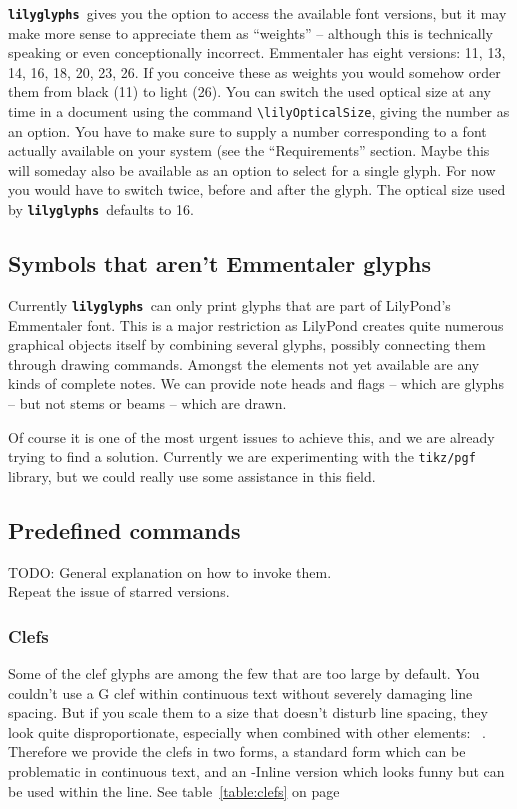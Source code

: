 \documentclass{article}
\newcommand{\lilyglyphs}{\texttt{\textbf{lilyglyphs\,}}}
\newcommand*{\cmd}[1]{\texttt{\textbackslash #1}}
\begin{document}
\lilyglyphs gives you the option to access the available font versions, but it may make more sense to appreciate them as \enquote{weights} -- although this is technically speaking or even conceptionally incorrect.
Emmentaler has eight versions: 11, 13, 14, 16, 18, 20, 23, 26. 
If you conceive these as weights you would somehow order them from black (11) to light (26).
You can switch the used optical size at any time in a document using the command \cmd{lilyOpticalSize}, giving the number as an option. 
You have to make sure to supply a number corresponding to a font actually available on your system (see the \enquote{Requirements} section.
Maybe this will someday also be available as an option to select for a single glyph.
For now you would have to switch twice, before and after the glyph.
The optical size used by \lilyglyphs defaults to 16.

\subsection{Symbols that aren't Emmentaler glyphs}
Currently \lilyglyphs can only print glyphs that are part of LilyPond's Emmentaler font. 
This is a major restriction as LilyPond creates quite numerous graphical objects itself by combining several glyphs, possibly connecting them through drawing commands.
Amongst the elements not yet available are any kinds of complete notes.
We can provide note heads and flags -- which are glyphs -- but not stems or beams -- which are drawn.

Of course it is one of the most urgent issues to achieve this, and we are already trying to find a solution. 
Currently we are experimenting with the \texttt{tikz/pgf} library, but we could really use some assistance in this field.

\subsection{Predefined commands}
TODO: General explanation on how to invoke them. \\
Repeat the issue of starred versions.

\subsubsection{Clefs}
Some of the clef glyphs are among the few that are too large by default. 
You couldn't use a G clef within continuous text without severely \clefG* damaging line spacing. 
But if you scale them to a size that doesn't disturb line spacing, they look quite disproportionate, especially when combined with other elements: \mbox{ \clefCInline* \natural.}
Therefore we provide the clefs in two forms, a standard form which can be problematic in continuous text, and an -Inline version which looks funny but can be used within the line.
See table~\ref{table:clefs} on page~\pageref{table:clefs}
\end{document}
